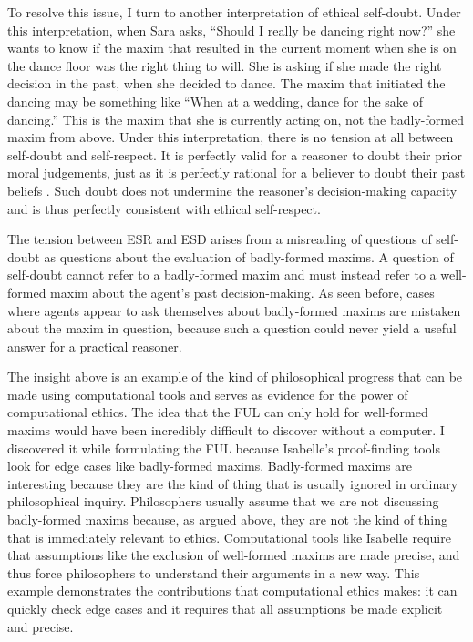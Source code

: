 \begin{isabellebody}
\begin{isamarkuptext}
To resolve this issue, I turn to another interpretation of ethical self-doubt. Under this interpretation, 
when Sara asks, ``Should I really be dancing right now?'' she wants to know if the maxim that 
resulted in the current moment when she is on the dance floor was the right thing to will. She is 
asking if she made the right decision in the past, when she decided to dance. The maxim that initiated 
the dancing may be something like ``When at a wedding, dance for the sake of dancing.'' This is the maxim 
that she is currently acting on, not the badly-formed maxim  from above. Under this interpretation, 
there is no tension at all between self-doubt and self-respect. It is perfectly valid for a reasoner 
to doubt their prior moral judgements, just as it is perfectly rational for a believer to doubt their 
past beliefs \cite[3-4]{christensen}. Such doubt does not undermine the reasoner's decision-making 
capacity and is thus perfectly consistent with ethical self-respect. 

The tension between ESR and ESD arises from a misreading of questions of self-doubt as questions about 
the evaluation of badly-formed maxims. A question of self-doubt cannot refer to a badly-formed maxim and must 
instead refer to a well-formed maxim about the agent's past decision-making. As seen before, cases where 
agents appear to ask themselves about badly-formed maxims are mistaken about the maxim in question, because 
such a question could never yield a useful answer for a practical reasoner.%
\end{isamarkuptext}\isamarkuptrue%
%
\isadelimdocument
%
\endisadelimdocument
%
\isatagdocument
%
\isamarkuptrue%
%
\endisatagdocument
{\isafolddocument}%
%
\isadelimdocument
%
\endisadelimdocument
%
\begin{isamarkuptext}%
The insight above is an example of the kind of philosophical progress that can be 
made using computational tools and serves as evidence for the power of computational ethics. The 
idea that the FUL can only hold for well-formed maxims would have been
incredibly difficult to discover without a computer. I discovered it while formulating the FUL because 
Isabelle's proof-finding tools look for edge cases like badly-formed maxims. Badly-formed maxims are 
interesting because they are the kind of thing that is usually ignored in ordinary philosophical inquiry. 
Philosophers usually assume that we are not discussing badly-formed maxims because, as argued above, 
they are not the kind of thing that is immediately relevant to ethics. Computational tools like Isabelle
require that assumptions like the exclusion of well-formed maxims are made precise, and thus force 
philosophers to understand their arguments in a new way. This example demonstrates the contributions
that computational ethics makes: it can quickly check edge cases and it requires that all assumptions be
made explicit and precise.


\end{isamarkuptext}
\end{isabellebody}
